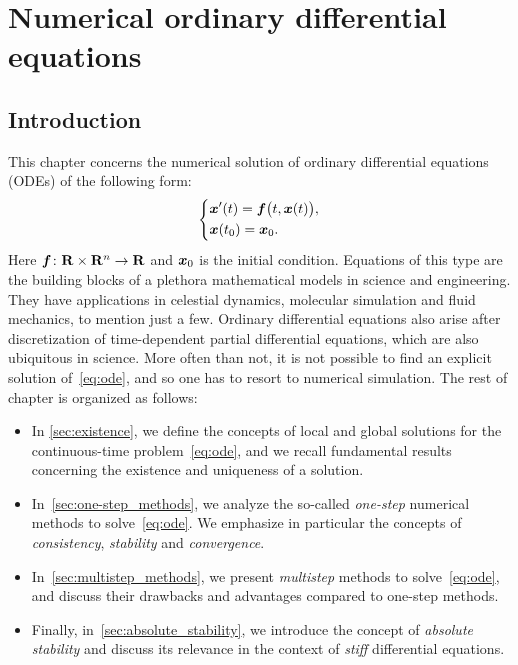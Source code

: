 \chapter{Numerical ordinary differential equations}
\label{cha:ode}

\minitoc

\section*{Introduction}
This chapter concerns the numerical solution of ordinary differential equations (ODEs) of the following form:
\begin{equation}
    \label{eq:ode}
    \left \{
    \begin{aligned}
        & \mathbf{\boldsymbol{x}}'(t) = \mathbf{\boldsymbol{f}}\bigl(t, \mathbf{\boldsymbol{x}}(t)\bigr), \\
        & \mathbf{\boldsymbol{x}}(t_0) = \mathbf{\boldsymbol{x}}_0.
    \end{aligned}
    \right.
\end{equation}
Here $\mathbf{\boldsymbol{f}}\colon \mathbf R \times \mathbf R^n \to \mathbf R$ and $\mathbf{\boldsymbol{x}}_0$ is the initial condition.
Equations of this type
are the building blocks of a plethora mathematical models in science and engineering.
They have applications in celestial dynamics, molecular simulation and fluid mechanics, to mention just a few.
Ordinary differential equations also arise after discretization of time-dependent partial differential equations,
which are also ubiquitous in science.
More often than not,
it is not possible to find an explicit solution of~\eqref{eq:ode},
and so one has to resort to numerical simulation.
The rest of chapter is organized as follows:
\begin{itemize}
    \item
        In \cref{sec:existence},
        we define the concepts of local and global solutions for the continuous-time problem~\eqref{eq:ode},
        and we recall fundamental results concerning the existence and uniqueness of a solution.

    \item
        In~\cref{sec:one-step_methods},
        we analyze the so-called \emph{one-step} numerical methods to solve~\eqref{eq:ode}.
        We emphasize in particular the concepts of \emph{consistency}, \emph{stability} and \emph{convergence}.

    \item
        In~\cref{sec:multistep_methods},
        we present \emph{multistep} methods to solve~\eqref{eq:ode},
        and discuss their drawbacks and advantages compared to one-step methods.

    \item
        Finally, in~\cref{sec:absolute_stability},
        we introduce the concept of \emph{absolute stability} and discuss its relevance in the context of \emph{stiff} differential equations.
\end{itemize}


